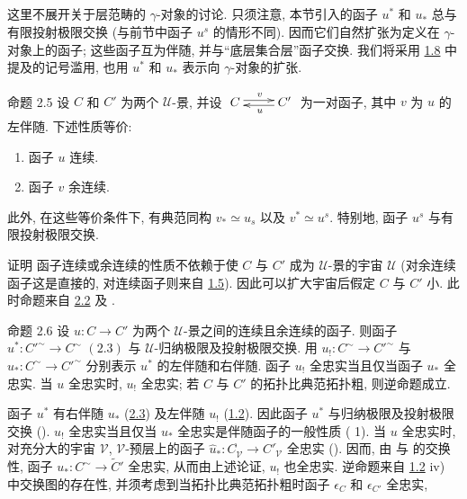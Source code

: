 \setcounter{subsection}{3}
\subsection{}
这里不展开关于层范畴的 $\gamma$-对象的讨论.
只须注意, 本节引入的函子 $u^{\ast}$ 和 $u_{\ast}$ 总与有限投射极限交换
(与前节中函子 $u^s$ 的情形不同).
因而它们自然扩张为定义在 $\gamma$-对象上的函子;
这些函子互为伴随, 并与“底层集合层”函子交换.
我们将采用 \hyperref[III.not1.8]{1.8} 中提及的记号滥用,
也用 $u^{\ast}$ 和 $u_{\ast}$ 表示向 $\gamma$-对象的扩张.

\begin{enonce*}{命题 2.5}
设 $C$ 和 $C'$ 为两个 $𝒰$-景, 并设
$\xymatrix{ C \ar@<2pt>[r]^{v}& C'\ar@<2pt>[l]^{u} }$
为一对函子, 其中 $v$ 为 $u$ 的左伴随. 下述性质等价:
\begin{enumerate}
\renewcommand{\theenumi}{\roman{enumi}}
\renewcommand{\labelenumi}{\theenumi)}
\item 函子 $u$ 连续.

\item 函子 $v$ 余连续.
\end{enumerate}
此外, 在这些等价条件下, 有典范同构 $v_{\ast}\simeq u_{s}$ 以及 $v^{\ast}\simeq u^s$.
特别地, 函子 $u^s$ 与有限投射极限交换.
\end{enonce*}

\begin{enonce*}[remark]{证明}
函子连续或余连续的性质不依赖于使 $C$ 与 $C'$ 成为 $𝒰$-景的宇宙 $𝒰$
(对余连续函子这是直接的, 对连续函子则来自 \hyperref[III.prop1.5]{1.5}).
因此可以扩大宇宙后假定 $C$ 与 $C'$ 小.
此时命题来自 \hyperref[III.prop2.2]{2.2} 及 .
\end{enonce*}

\begin{enonce*}{命题 2.6}
设\pageoriginale{} $u:C\rightarrow C'$ 为两个 $𝒰$-景之间的连续且余连续的函子.
则函子 $u^{\ast}:{C'}^{\sim}\rightarrow C^{\sim}$
$(\hyperref[III.prop2.3]{2.3})$ 与 $𝒰$-归纳极限及投射极限交换.
用 $u_{!}:C^{\sim}\rightarrow {C'}^{\sim}$ 与 $u_{\ast}:C^{\sim}\rightarrow {C'}^{\sim}$
分别表示 $u^{\ast}$ 的左伴随和右伴随.
函子 $u_{!}$ 全忠实当且仅当函子 $u_{\ast}$ 全忠实.
当 $u$ 全忠实时, $u_{!}$ 全忠实;
若 $C$ 与 $C'$ 的拓扑比典范拓扑粗, 则逆命题成立.
\end{enonce*}

函子 $u^{\ast}$ 有右伴随 $u_{\ast}$ (\hyperref[III.prop2.3]{2.3})
及左伴随 $u_{!}$ (\hyperref[III.prop1.2]{1.2}).
因此函子 $u^{\ast}$ 与归纳极限及投射极限交换 ().
$u_{!}$ 全忠实当且仅当 $u_{\ast}$ 全忠实是伴随函子的一般性质
( 1).
当 $u$ 全忠实时, 对充分大的宇宙 $𝒱$,
$𝒱$-预层上的函子
$\widehat{u}_{\ast}:C^{\widehat{\phantom{,}}}_{𝒱}\rightarrow {C'}^{\widehat{\phantom{,}}}_{𝒱}$
全忠实 ().
因而, 由  与  的交换性,
函子 $u_{\ast}:C^{\sim}\rightarrow \widetilde{C}'$ 全忠实,
从而由上述论证, $u_{!}$ 也全忠实.
逆命题来自 \hyperref[III.prop1.2]{1.2} iv) 中交换图的存在性,
并须考虑到当拓扑比典范拓扑粗时函子 $\epsilon_C$ 和 $\epsilon_{C'}$ 全忠实, \cqfd

